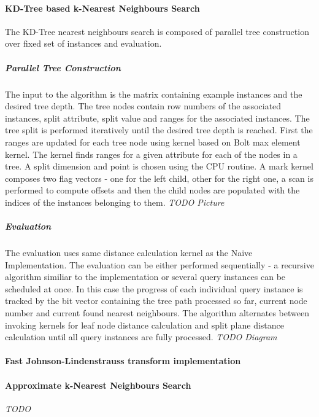 \paragraph*{KD-Tree based k-Nearest Neighbours Search}
The KD-Tree nearest neighbours search is composed of parallel tree construction
over fixed set of instances and evaluation. 
\subparagraph*{Parallel Tree Construction}
The input to the algorithm is the matrix containing example instances and the
desired tree depth.
The tree nodes contain row numbers of the associated instances, split attribute,
split value and  ranges for the associated instances.
The tree split is performed iteratively until the desired tree depth is reached. 
First the ranges are updated for each tree node using kernel based on
Bolt max element kernel\cite{Bolt}. The kernel finds ranges for a
given attribute for each of the nodes in a tree.
A split dimension and point is chosen using the CPU routine.
A mark kernel composes two flag vectors - one for the left child, other for the
right one, a scan is performed to compute offsets and then the child nodes are
populated with the indices of the instances belonging to them.
\textit{TODO Picture}

\subparagraph*{Evaluation}
The evaluation uses same distance calculation kernel as the Naive
Implementation. The evaluation can be either performed sequentially - a
recursive algorithm similiar to the\cite{MOA} implementation or several query
instances can be scheduled at once. 
In this case the progress of each individual query instance is tracked by the
bit vector containing the tree path processed so far, current
node number and current found nearest neighbours.
The algorithm alternates between invoking kernels for leaf node distance
calculation and split plane distance calculation until all query instances are
fully processed.
 \textit{TODO Diagram}

\paragraph*{Fast Johnson-Lindenstrauss transform implementation}
  
\paragraph*{Approximate k-Nearest Neighbours Search}
\textit{TODO}


